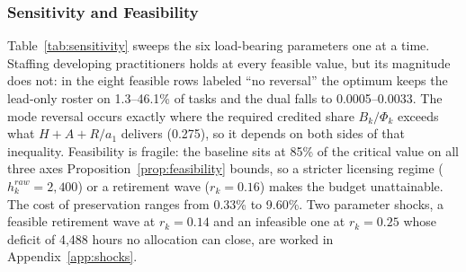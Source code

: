 \documentclass[utf8]{FrontiersinHarvard}
\begin{document}
	\subsubsection*{Sensitivity and Feasibility}
	\label{sec:sensitivity}

	Table~\ref{tab:sensitivity} sweeps the six load-bearing parameters one at a time. Staffing developing practitioners holds at every feasible value, but its magnitude does not: in the eight feasible rows labeled ``no reversal'' the optimum keeps the lead-only roster on 1.3--46.1\% of tasks and the dual falls to 0.0005--0.0033. The mode reversal occurs exactly where the required credited share $B_k/\Phi_k$ exceeds what $H{+}A{+}R/a_1$ delivers (0.275), so it depends on both sides of that inequality. Feasibility is fragile: the baseline sits at 85\% of the critical value on all three axes Proposition~\ref{prop:feasibility} bounds, so a stricter licensing regime ($h^{raw}_k=2{,}400$) or a retirement wave ($r_k=0.16$) makes the budget unattainable. The cost of preservation ranges from 0.33\% to 9.60\%. Two parameter shocks, a feasible retirement wave at $r_k=0.14$ and an infeasible one at $r_k=0.25$ whose deficit of 4{,}488 hours no allocation can close, are worked in Appendix~\ref{app:shocks}.
\end{document}
